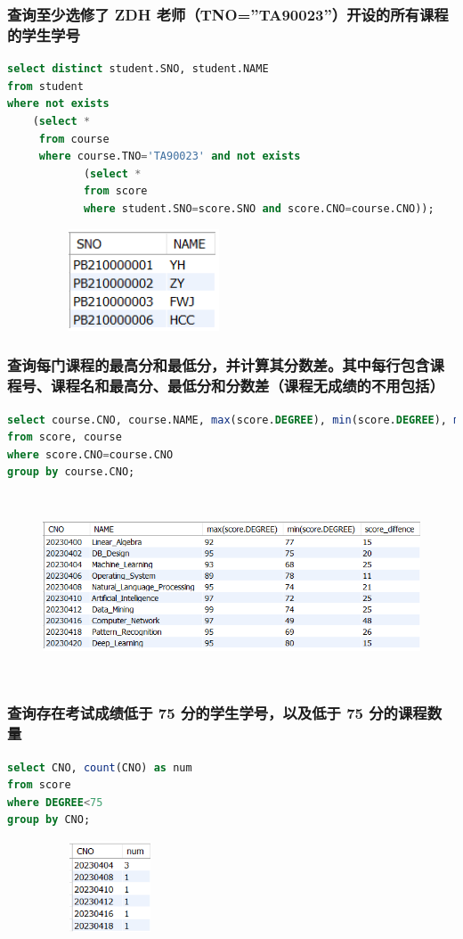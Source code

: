 \documentclass{ctexart}
\begin{document}
\subsubsection{查询至少选修了 ZDH 老师（TNO=”TA90023”）开设的所有课程的学生学号}
\begin{lstlisting}[language=sql]
select distinct student.SNO, student.NAME
from student
where not exists
	(select *
	 from course
     where course.TNO='TA90023' and not exists
			(select *
            from score
            where student.SNO=score.SNO and score.CNO=course.CNO));
\end{lstlisting}
\begin{figure}[H]
	\centering 
	\includegraphics[height=3cm,width=6cm]{35.png}
	\end{figure}
\subsubsection{查询每门课程的最高分和最低分，并计算其分数差。其中每行包含课程号、课程名和最高分、最低分和分数差（课程无成绩的不用包括）}
\begin{lstlisting}[language=sql]
select course.CNO, course.NAME, max(score.DEGREE), min(score.DEGREE), max(score.DEGREE)-min(score.DEGREE) as score_diffence
from score, course
where score.CNO=course.CNO
group by course.CNO;
\end{lstlisting}
\begin{figure}[H]
	\centering 
	\includegraphics[height=5.5cm,width=14cm]{36.png}
	\end{figure}
\subsubsection{查询存在考试成绩低于 75 分的学生学号，以及低于 75 分的课程数量}
\begin{lstlisting}[language=sql]
	select CNO, count(CNO) as num
from score
where DEGREE<75
group by CNO;
\end{lstlisting}
\begin{figure}[H]
	\centering 
	\includegraphics[height=2.7cm,width=4cm]{37.png}
	\end{figure}
\end{document}

